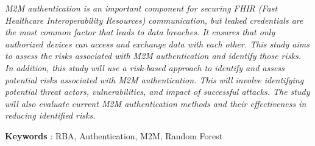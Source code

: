\textit{
	M2M authentication is an important component for securing FHIR (Fast Healthcare Interoperability Resources) communication, but leaked credentials are the most common factor that leads to data breaches. It ensures that only authorized devices can access and exchange data with each other. This study aims to assess the risks associated with M2M authentication and identify those risks.
	In addition, this study will use a risk-based approach to identify and assess potential risks associated with M2M authentication. This will involve identifying potential threat actors, vulnerabilities, and impact of successful attacks. The study will also evaluate current M2M authentication methods and their effectiveness in reducing identified risks.
}

\noindent\textbf{Keywords} : RBA, Authentication, M2M, Random Forest